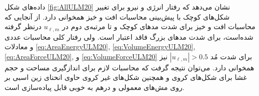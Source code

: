 داده‌های شکل 
\ref{fig:AllULM20}
نشان می‌دهد که رفتار انرژی و نیرو برای تغییر شکل‌های کوچک با پیش‌بینی محاسبات افت و خیز همخوانی دارد. از آنجایی که محاسبات افت و خیز برای شدت مد‌های کوچک و تا مرتبه‌ی دوم در 
$u_{\ell,m}$
درنظر گرفته شده‌است، برای شدت‌ مد‌های بزرگ فاقد اعتبار است. ولی رفتار کلی محاسبات عددی و معادلات
\ref{eq:AreaEnergyULM20}, \ref{eq:VolumeEnergyULM20}, \ref{eq:AreaForceULM20}, 
 و
\ref{eq:VolumeForceULM20}
برای شد‌ت مُد 
$|u_{\ell,m}|>0.5$
نیز همخوانی دارد. می‌توان نتیجه گرفت که محاسبات لازم برای اندازگیری مساحت و حجم غشا برای شکل‌های کروی و همچنین شکل‌های غیر کروی حاوی انحنای زین اسبی بر روی مش‌های معمولی  و  درهم به خوبی قابل پیاده‌سازی است.










